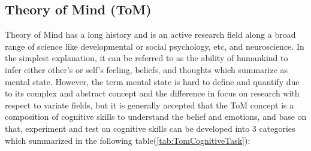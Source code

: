 \documentclass[12pt]{article}
\begin{document}
\newpage
\subsection{Theory of Mind (ToM)}\label{ToM}
Theory of Mind has a long history and is an active research field along a broad range of science like developmental or social  psychology, etc, and neuroscience. In the simplest explanation, it can be referred to as the ability of humankind to infer either other's or self's feeling, beliefs, and thoughts which summarize as mental state\cite{Byom_2013}. However, the term mental state is hard to define and quantify due to its complex and abstract concept and the difference in focus on research with respect to variate fields, but it is generally accepted that the ToM concept is a composition of cognitive skills to understand the belief and emotions\cite{Beaudoin_2020}, and base on that, experiment and test on cognitive skills can be developed into 3 categories which summarized in the following table(\ref{tab:TomCognitiveTask})\cite{Beaudoin_2020,Byom_2013}: 
\end{document}
